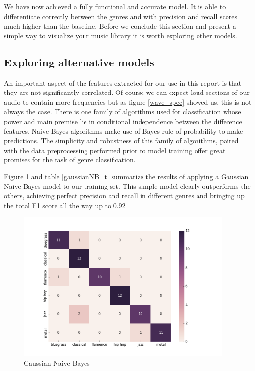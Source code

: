 \documentclass[12pt]{article}
\begin{document}
We have now achieved a fully functional and accurate model. It is able to differentiate correctly between the genres and with precision and recall scores much higher than the baseline. Before we conclude this section and present a simple way to visualize your music library it is worth exploring other models.
\medskip

\subsection*{Exploring alternative models}
An important aspect of the features extracted for our use in this report is that they are not significantly correlated. Of course we can expect loud sections of our audio to contain more frequencies but as figure \ref{wave_spec} showed us, this is not always the case. There is one family of algorithms used for classification whose power and main premise lie in conditional independence between the difference features. Naive Bayes algorithms make use of Bayes rule of probability to make predictions. The simplicity and robustness of this family of algorithms, paired with the data preprocessing performed prior to model training offer great promises for the task of genre classification.
\medskip

Figure \ref{gaussianNB} and table \ref{gaussianNB_t} summarize the results of applying a Gaussian Naive Bayes model to our training set. This simple model clearly outperforms the others, achieving perfect precision and recall in different genres and bringing up the total F1 score all the way up to 0.92

\begin{figure}
\centering
  \includegraphics[width=0.95\textwidth]{gaussianNB.png}
  \caption{Gaussian Naive Bayes}
  \label{gaussianNB}
\end{figure}
\end{document}

